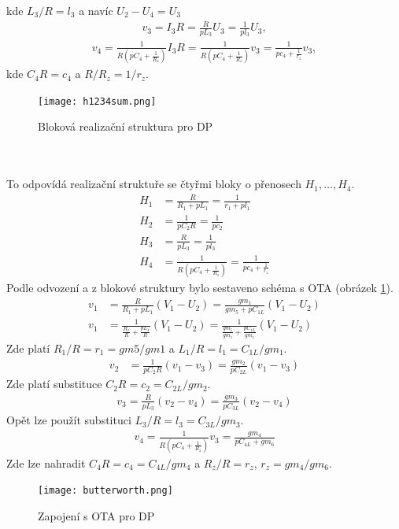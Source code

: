 kde $L_3/R = l_3$ a navíc $U_2 - U_4 = U_3$
\begin{align}
v_3 = I_3R = \frac{R}{pL_3}U_3 = \frac{1}{pl_3}U_3,
\end{align}
\begin{align}
v_4 = \frac{1}{R(pC_4 + \frac{1}{R_z})}I_3R = \frac{1}{R(pC_4 + \frac{1}{R_z})}v_3 = \frac{1}{pc_4 + \frac{1}{r_z}}v_3,
\end{align}
kde $C_4R = c_4$ a $R/R_z = 1/r_z$.
\begin{figure}[h]
\centering
\texttt{[image: h1234sum.png]}
\caption{Bloková realizační struktura pro DP}
\end{figure}
\\
\\
\noindent To odpovídá realizační struktuře se čtyřmi bloky o přenosech $H_1, \ldots,H_4$.
\begin{align}
H_1 & = \frac{R}{R_1 + pL_1} = \frac{1}{r_1 + pl_1}\\
H_2 &= \frac{1}{pC_2R} = \frac{1}{pc_2}\\
H_3 &= \frac{R}{pL_3} = \frac{1}{pl_3}\\
H_4 &= \frac{1}{R(pC_4 + \frac{1}{R_z})} = \frac{1}{pc_4 + \frac{1}{r_z}}
\end{align}
Podle odvození a z blokové struktury bylo sestaveno schéma s OTA (obrázek \ref{s:OTADP}).
\begin{align}
v_1 &= \frac{R}{R_1 + pL_1}(V_1 - U_2) = \frac{gm_1}{gm_5 + pC_{1L}}(V_1 - U_2)\\
v_1 &= \frac{1}{\frac{R_1}{R} + \frac{pL_1}{R}}(V_1 - U_2) = \frac{1}{\frac{gm_5}{gm_1} + \frac{pC_{1L}}{gm_1}}(V_1 - U_2)
\end{align}
Zde platí $R_1/R = r_1 = gm5/gm1$ a $L_1/R = l_1 = C_{1L}/gm_1$.
\begin{align}
v_2 &= \frac{1}{pC_2R}(v_1 - v_3) = \frac{gm_2}{pC_{2L}}(v_1 - v_3)
\end{align}
Zde platí substituce $C_2R = c_2 = C_{2L}/gm_2$.
\begin{align}
v_3 = \frac{R}{pL_3}(v_2 - v_4) = \frac{gm_3}{pC_{3L}}(v_2 - v_4)
\end{align}
Opět lze použít substituci $L_3/R = l_3 = C_{3L}/gm_3$.
\begin{align}
v_4 = \frac{1}{R(pC_4 + \frac{1}{R_z})}v_3 = \frac{gm_4}{pC_{4L} + gm_6}
\end{align}
Zde lze nahradit $C_4R = c_4 = C_{4L}/gm_4$ a $R_z/R = r_z$, $r_z = gm_4/gm_6$.
\begin{figure}[H]
\centering
\texttt{[image: butterworth.png]}
\caption{Zapojení s OTA pro DP \label{s:OTADP}}
\end{figure}
